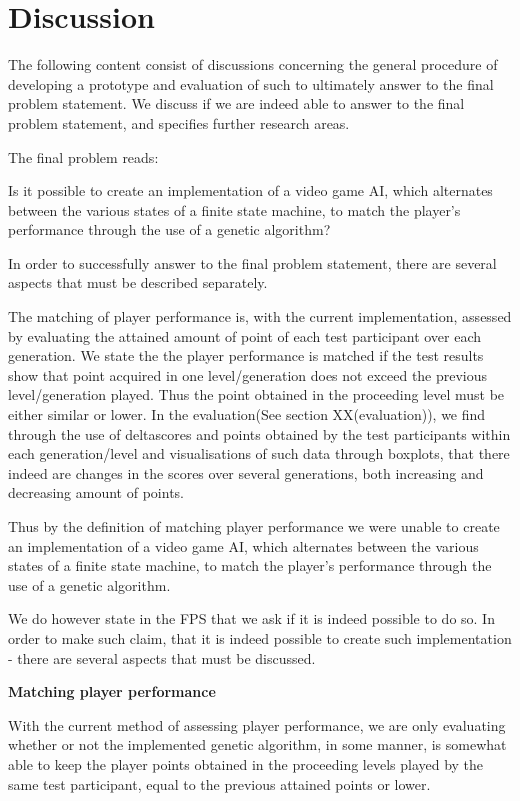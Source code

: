 \section{Discussion} \label{sec:discussion}

The following content consist of discussions concerning the general procedure of developing a prototype and evaluation of such to ultimately answer to the final problem statement. We discuss if we are indeed able to answer to the final problem statement, and specifies further research areas. 


The final problem reads:

Is it possible to create an implementation of a video game AI, which alternates between the various states of a finite state machine, to match the player's performance through the use of a genetic algorithm?



In order to successfully answer to the final problem statement, there are several aspects that must be described separately.

The matching of player performance is, with the current implementation, assessed by evaluating the attained amount of point of each test participant over each generation. We state the the player performance is matched if the test results show that point acquired in one level/generation does not exceed the previous level/generation played. Thus the point obtained in the proceeding level must be either similar or lower.
In the evaluation(See section XX(evaluation)), we find through the use of deltascores and points obtained by the test participants within each generation/level and visualisations of such data through boxplots, that there indeed are changes in the scores over several generations, both increasing and decreasing amount of points.

Thus by the definition of matching player performance we were unable to create an implementation of a video game AI, which alternates between the various states of a finite state machine, to match the player's performance through the use of a genetic algorithm.

We do however state in the FPS that we ask if it is indeed possible to do so. In order to make such claim, that it is indeed possible to create such implementation - there are several aspects that must be discussed.

\textbf{Matching player performance}

With the current method of assessing player performance, we are only evaluating whether or not the implemented genetic algorithm, in some manner, is somewhat able to keep the player points obtained in the proceeding levels played by the same test participant, equal to the previous attained points or lower.



